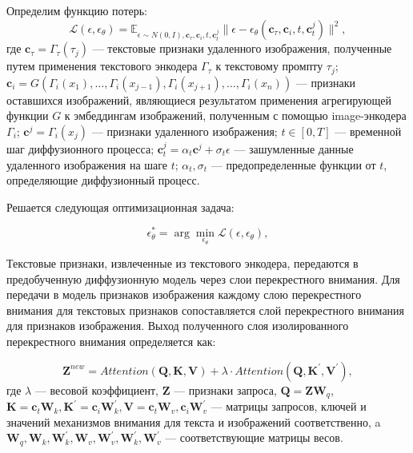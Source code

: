 \documentclass{article}
\begin{document}
Определим функцию потерь: 
\begin{equation}
\mathcal{L}(\epsilon, \epsilon_{\theta}) = \mathbb{E}_{\epsilon \sim N(0, I),\mathbf{c}_{\tau}, \mathbf{c}_{i}, t, \mathbf{c}^{j}_{t}} \|\epsilon - \epsilon_{\theta}(\mathbf{c}_{\tau}, \mathbf{c}_{i}, t, \mathbf{c}^{j}_{t})\|^2,
\end{equation}
где $\mathbf{c}_{\tau} = \Gamma_\tau(\tau_j)$ --- текстовые признаки удаленного изображения, полученные путем применения текстового энкодера $\Gamma_\tau$ к текстовому промпту $\tau_j$; $\mathbf{c}_{i} = G(\Gamma_i(x_1), \dots, \Gamma_i(x_{j-1}), \Gamma_i(x_{j+1}), \dots, \Gamma_i(x_n))$ --- признаки оставшихся изображений, являющиеся результатом применения агрегирующей функции $G$ к эмбеддингам изображений, полученным с помощью image-энкодера $\Gamma_i$; $\mathbf{c}^{j} = \Gamma_i(x_j)$ --- признаки удаленного изображения; $t \in [0, T]$ --- временной шаг диффузионного процесса; $\mathbf{c}^{j}_{t} = \alpha_t \mathbf{c}^{j}  + \sigma_t \epsilon$ --- зашумленные данные удаленного изображения на шаге $t$; $\alpha_t, \sigma_t$ --- предопределенные функции от $t$, определяющие диффузионный процесс.

Решается следующая оптимизационная задача:

\begin{equation}
\epsilon_{\theta}^* = \arg \min_{\epsilon_{\theta}}\mathcal{L}(\epsilon, \epsilon_{\theta}),
\end{equation}

Текстовые признаки, извлеченные из текстового энкодера, передаются в предобученную диффузионную модель через слои перекрестного внимания. Для передачи в модель признаков изображения каждому слою перекрестного внимания для текстовых признаков сопоставляется слой перекрестного внимания для признаков изображения. Выход полученного слоя изолированного перекрестного внимания определяется как:

\begin{equation}
\mathbf{Z}^{new} = Attention(\mathbf{Q}, \mathbf{K}, \mathbf{V}) + \lambda \cdot Attention(\mathbf{Q}, \mathbf{K}^{\prime}, \mathbf{V}^{\prime}), 
\end{equation}
где $\lambda$ --- весовой коэффициент, $\mathbf{Z}$ --- признаки запроса, $\mathbf{Q} = \mathbf{Z}\mathbf{W}_q$, $\mathbf{K} = \mathbf{c}_t\mathbf{W}_k, \mathbf{K}^{\prime} = \mathbf{c}_i {\mathbf{W}}^{\prime}_{k}, \mathbf{V} = \mathbf{c}_t\mathbf{W}_{v}, \mathbf{c}_i {\mathbf{W}}^{\prime}_{v}$ --- матрицы запросов, ключей и значений механизмов внимания для текста и изображений соответственно, a $\mathbf{W}_q, \mathbf{W}_k, {\mathbf{W}}^{\prime}_{k}, \mathbf{W}_v, {\mathbf{W}}^{\prime}_{v}, {\mathbf{W}}^{\prime}_k,{\mathbf{W}}^{\prime}_v$ --- соответствующие матрицы весов. 
\end{document}
